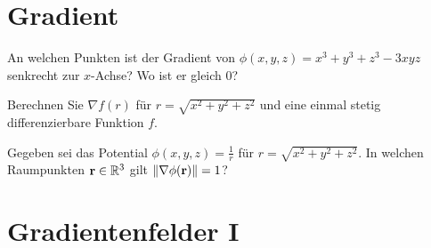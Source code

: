 \documentclass{scrartcl}
\begin{document}
\maketitle

\section{Gradient }
\label{sec:gradient}

\begin{subex}
  \item{} An welchen Punkten ist der Gradient von $\phi(x,y,z) = x^3 + y^3 + z^3 - 3xyz$ senkrecht zur $x$-Achse?
  Wo ist er gleich 0?
  \item{} Berechnen Sie $\nabla f(r)$ für $r = \sqrt{x^2 + y^2 + z^2}$ und eine einmal stetig differenzierbare Funktion $f$.
  \item{} Gegeben sei das Potential $\phi(x, y, z) = \frac{1}{r}$ für $r = \sqrt{x^2 + y^2 + z^2}$. In welchen Raumpunkten $\mathbf{r} \in \mathbb{R}^3$ gilt $\Vert \nabla \phi (\mathbf{r}) \Vert = 1$?
\end{subex}

\section{Gradientenfelder I }
\label{sec:gradientenfelder1}
\end{document}
